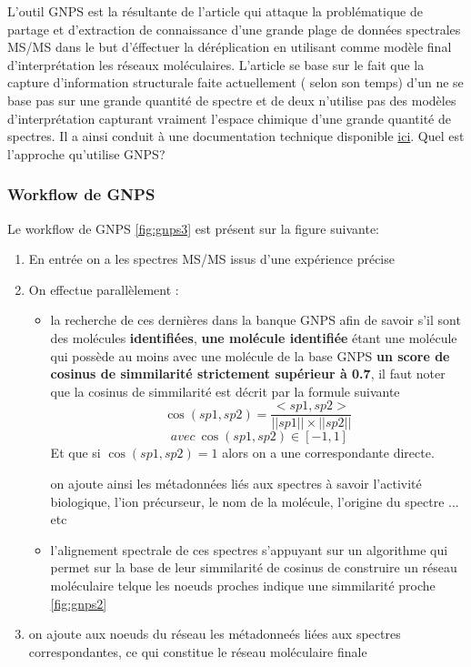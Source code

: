\documentclass[letterpaper,twocolumn,10pt]{article}
\begin{document}
    L'outil GNPS est la résultante de l'article \cite{wang2016sharing} qui attaque la problématique de partage et d'extraction de connaissance d'une grande plage de données spectrales MS/MS dans le but d'éffectuer la déréplication en utilisant comme modèle final d'interprétation les réseaux moléculaires. L'article se base sur le fait que la capture d'information structurale faite actuellement ( selon son temps) d'un ne se base pas sur une grande quantité de spectre et de deux n'utilise pas des modèles d'interprétation capturant vraiment l'espace chimique d'une grande quantité de spectres. Il a ainsi conduit à une documentation technique disponible \href{https://github.com/CCMS-UCSD/GNPSDocumentation/tree/notebooks-docs}{ici}. Quel est l'approche qu'utilise GNPS?
    
\subsubsection{Workflow de GNPS}
    Le workflow de GNPS \ref{fig:gnps3} est présent sur la figure suivante: 
    \begin{enumerate}
        \item En entrée on a les spectres MS/MS issus d'une expérience précise
        \item On effectue parallèlement :
            \begin{itemize}
                \item la recherche de ces dernières dans la banque GNPS afin de savoir s'il sont des molécules \textbf{identifiées}, \textbf{une molécule identifiée} étant une molécule qui possède au moins avec une molécule de la base GNPS \textbf{un score de cosinus de simmilarité strictement supérieur à 0.7}, il faut noter que la cosinus de simmilarité est décrit par la formule suivante 
                    \begin{equation}
                        \cos(sp1, sp2) = \frac{<sp1, sp2>}{||sp1||\times||sp2||}
                    \end{equation}
                    $$\ avec\ \cos(sp1, sp2) \in [-1, 1]$$
                Et que si $\cos(sp1, sp2) = 1$ alors on a une correspondante directe. 
                
                on ajoute ainsi les métadonnées liés aux spectres à savoir l'activité biologique, l'ion précurseur, le nom de la molécule, l'origine du spectre ... etc
                \item l'alignement spectrale de ces spectres s'appuyant sur un algorithme qui permet sur la base de leur simmilarité de cosinus de construire un réseau moléculaire telque les noeuds proches indique une simmilarité proche \ref{fig:gnps2}
                
            \end{itemize}
            
        \item on ajoute aux noeuds du réseau les métadonneés liées aux spectres correspondantes, ce qui constitue le réseau moléculaire finale
    \end{enumerate}
\end{document}
